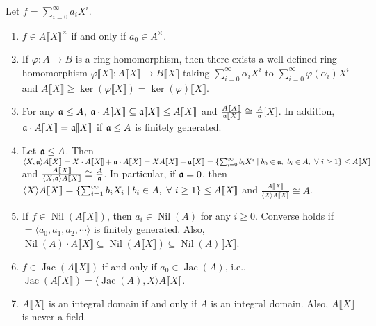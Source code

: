 \begin{proposition}
    Let $f = \sum_{i=0}^\infty a_iX^i$.
    \begin{enumerate}
        \item $f \in A \llbracket X \rrbracket^\times$ if and only if $a_0 \in A^\times$. 
        \item If $\varphi: A \to B$ is a ring homomorphism, then there exists a well-defined ring homomorphism $\varphi\llbracket X \rrbracket: A\llbracket X \rrbracket \to B\llbracket X \rrbracket$ taking $\sum_{i=0}^\infty \alpha_iX^i$ to $\sum_{i=0}^\infty \varphi(\alpha_i)X^i$ and $A\llbracket X \rrbracket \geq \ker(\varphi \llbracket X \rrbracket) = \ker(\varphi)\llbracket X \rrbracket$. 
        \item For any $\mathfrak{a} \leq A$, $\mathfrak{a} \cdot A \llbracket X \rrbracket \subseteq \mathfrak{a} \llbracket X \rrbracket \leq A\llbracket X \rrbracket$ and $\frac{A \llbracket X \rrbracket}{\mathfrak{a} \llbracket X \rrbracket} \cong \frac{A}{\mathfrak{a}}[X]$. In addition, $\mathfrak{a} \cdot A\llbracket X \rrbracket = \mathfrak{a} \llbracket X \rrbracket$ if $\mathfrak{a} \leq A$ is finitely generated. 
        \item Let $\mathfrak{a} \leq A$. Then $\langle X,\mathfrak{a} \rangle A\llbracket X \rrbracket = X \cdot A \llbracket X \rrbracket + \mathfrak{a} \cdot A \llbracket X \rrbracket = XA \llbracket X \rrbracket + \mathfrak{a} \llbracket X \rrbracket = \{\sum_{i=0}^\infty b_iX^i \mid b_0 \in \mathfrak{a},\ b_i \in A, \ \forall \  i \geq 1\} \leq A \llbracket X \rrbracket$ and $\frac{A \llbracket X \rrbracket}{\langle X,\mathfrak{a} \rangle A \llbracket X \rrbracket} \cong \frac{A}{\mathfrak{a}}$. In particular, if $\mathfrak{a} = 0$, then $\langle X \rangle A \llbracket X \rrbracket = \{\sum_{i=1}^\infty b_iX_i \mid b_i \in A, \ \forall \  i \geq 1\} \leq A\llbracket X \rrbracket$ and $\frac{A\llbracket X \rrbracket}{\langle X \rangle A \llbracket X \rrbracket} \cong A$. 
        \item If $f \in \operatorname{Nil}(A\llbracket X \rrbracket)$, then $a_i \in \operatorname{Nil}(A)$ for any $i \geq 0$. Converse holds if $ = \langle a_0,a_1,a_2,\cdots \rangle$ is finitely generated. Also, $\operatorname{Nil}(A) \cdot A \llbracket X \rrbracket \subseteq \operatorname{Nil}(A \llbracket X \rrbracket) \subseteq \operatorname{Nil}(A) \llbracket X \rrbracket$.
        \item $f \in \operatorname{Jac}(A\llbracket X \rrbracket)$ if and only if $a_0 \in \operatorname{Jac}(A)$, i.e., $\operatorname{Jac}(A\llbracket X \rrbracket) = \langle \operatorname{Jac}(A),X \rangle A\llbracket X \rrbracket$. 
        \item $A\llbracket X \rrbracket$ is an integral domain if and only if $A$ is an integral domain. Also, $A\llbracket X \rrbracket$ is never a field.

\end{enumerate}
\end{proposition}
